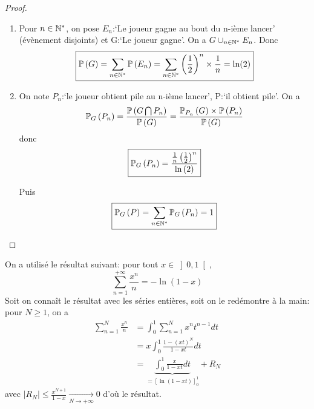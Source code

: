 \begin{proof}
    \phantom{}
    \begin{enumerate}
        \item Pour $n\in\N^{*}$, on pose $E_{n}$:`Le joueur gagne au bout du n-ième lancer' (évènement disjoints) et G:`Le joueur gagne'. On a $G\cup_{n\in\N^{*}}E_{n}$. Donc 
        \begin{equation}
            \boxed{\P\left(G\right)=\sum_{n\in\N^{*}}\P\left(E_{n}\right)=\sum_{n\in\N^{*}}\left(\frac{1}{2}\right)^{n}\times\frac{1}{n}=\ln(2)}
        \end{equation}

        \item On note $P_{n}$:`le joueur obtient pile au n-ième lancer', P:`il obtient pile'. On a 
        \begin{equation}
            \P_{G}\left(P_{n}\right)=\frac{\P\left(G\bigcap P_{n}\right)}{\P\left(G\right)}=\frac{\P_{P_{n}}\left(G\right)\times\P\left(P_{n}\right)}{\P\left(G\right)}
        \end{equation}
        donc 
        \begin{equation}
            \boxed{\P_{G}\left(P_{n}\right)=\frac{\frac{1}{n}\left(\frac{1}{2}    \right)^{n}}{\ln\left(2\right)}}
        \end{equation}

        Puis 
        \begin{equation}
            \boxed{\P_{G}\left(P\right)=\sum_{n\in\N^{*}}\P_{G}\left(P_{n}\right)=1}
        \end{equation}
    \end{enumerate}
\end{proof}

\begin{remark}
    On a utilisé le résultat suivant: pour tout $x\in\left]0,1\right[$, 
    \begin{equation}
        \sum_{n=1}^{+\infty}\frac{x^{n}}{n}=-\ln\left(1-x\right)
    \end{equation}
    Soit on connaît le résultat avec les séries entières, soit on le redémontre à la main: pour $N\geqslant1$, on a 
    \begin{align}
        \sum_{n=1}^{N}\frac{x^{n}}{n}
        &=\int_{0}^{1}\sum_{n=1}^{N}x^{n}t^{n-1}dt\\
        &=x\int_{0}^{1}\frac{1-\left(xt\right)^{N}}{1-xt}dt\\
        &=\underbrace{\int_{0}^{1}\frac{x}{1-xt}dt}_{=\left[\ln\left(1-xt\right)\right]_{0}^{1}}+R_{N}
    \end{align}
    avec $\left\lvert R_{N}\right\rvert\leqslant\frac{x^{N+1}}{1-x}\xrightarrow[N\to+\infty]{}0$ d'où le résultat.
\end{remark}

